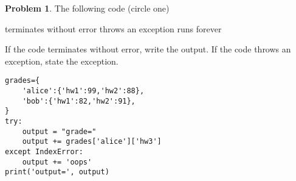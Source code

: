 \documentclass[10pt]{article}
\theoremstyle{definition}
\newtheorem{problem}{Problem}
\begin{document}
\begin{problem}
    The following code (circle one)

    \vspace{0.25in}
    \hspace{0.5in}terminates without error 
    \hspace{1in}throws an exception
    \hspace{1in}runs forever
    \vspace{0.25in}

    \noindent
    If the code terminates without error, write the output.
    If the code throws an exception, state the exception.
\end{problem}
\begin{lstlisting}
grades={
    'alice':{'hw1':99,'hw2':88},
    'bob':{'hw1':82,'hw2':91},
}
try:
    output = "grade="
    output += grades['alice']['hw3']
except IndexError:
    output += 'oops'
print('output=', output)
\end{lstlisting}
\vspace{1.5in}
\end{document}
